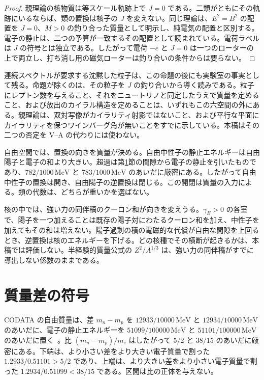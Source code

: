 \documentclass[a4paper]{article}
\begin{document}
\begin{proof}
親理論の核物質は等スケール軌跡上で \(J=0\) である。二類がともにその軌跡にいるならば、類の置換は核子の \(J\) を変えない。同じ理論は、\(E^{2}=B^{2}\) の配置を \(J=0\)、\(M>0\) の釣り合った質量として明示し、純電気の配置と区別する。電子の静止は、二つの予算が一致するその配置として読まれている。電荷ラベルは \(J\) の符号とは独立である。したがって電荷 \(-e\) と \(J=0\) は一つのローターの上で両立し、打ち消し用の磁気ローターは釣り合いの条件からは要らない。
\end{proof}

連続スペクトルが要求する沈黙した粒子は、この命題の後にも実験室の事実として残る。命題が除くのは、その粒子を \(J\) の釣り合いから導く読みである。粒子にレプトン数を与えること、それをニュートリノと同定したうえで質量を定めること、および放出のカイラル構造を定めることは、いずれもこの六空間の外にある。親理論は、双対写像がカイラリティ射影ではないこと、および平行な平面にカイラリティを保つワインバーグ角が無いことをすでに示している。本稿はその二つの否定を V--A の代わりには使わない。

自由空間では、置換の向きを質量が決める。自由中性子の静止エネルギーは自由陽子と電子の和より大きい。超過は第\ref{sec:gap}節の間隙から電子の静止を引いたものであり、\(782/1000\,\mathrm{MeV}\) と \(783/1000\,\mathrm{MeV}\) のあいだに厳密にある。したがって自由中性子の置換は開き、自由陽子の逆置換は閉じる。この開閉は質量の入力による。類の代数は、どちらが重いかを選ばない。

核の中では、強い力の同伴稿のクーロン和が向きを変えうる。\(\gamma_E>0\) の各室で、陽子を一つ加えることは既存の陽子対にわたるクーロン和を加え、中性子を加えてもその和は増えない。陽子過剰の積の電磁的な代償が自由な間隙を上回るとき、逆置換は核のエネルギーを下げる。どの核種でその横断が起きるかは、本稿では評価しない。半経験的質量公式の \(Z^{2}/A^{1/3}\) は、強い力の同伴稿がすでに導出しない係数のままである。

\section{質量差の符号}
\label{sec:gap}

CODATA の自由質量は、差 \(m_n-m_p\) を \(12933/10000\,\mathrm{MeV}\) と \(12934/10000\,\mathrm{MeV}\) のあいだに、電子の静止エネルギーを \(51099/100000\,\mathrm{MeV}\) と \(51101/100000\,\mathrm{MeV}\) のあいだに置く~\cite{codata2018}。比 \((m_n-m_p)/m_e\) はしたがって \(5/2\) と \(38/15\) のあいだに厳密にある。下端は、より小さい差をより大きい電子質量で割った \(1.2933/0.51101>5/2\) であり、上端は、より大きい差をより小さい電子質量で割った \(1.2934/0.51099<38/15\) である。区間は比の正体を与えない。
\end{document}
